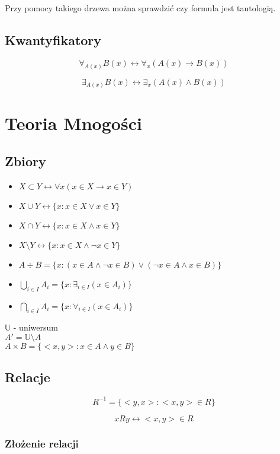 \documentclass{../notatki}
\begin{document}
Przy pomocy takiego drzewa można sprawdzić czy formula jest tautologią.

\subsection{Kwantyfikatory}

$$
\forall_{A(x)} B(x) \leftrightarrow \forall_{x} (A(x) \rightarrow B(x))
$$

$$
\exists_{A(x)} B(x) \leftrightarrow \exists_{x} (A(x) \land B(x))
$$

\section{Teoria Mnogości}

\subsection{Zbiory}

\begin{itemize}
  \item $X \subset Y \leftrightarrow \forall x (x \in X \rightarrow x \in Y)$
  \item $X \cup Y \leftrightarrow \{x : x \in X \lor x \in Y\}$
  \item $X \cap Y \leftrightarrow \{x : x \in X \land x \in Y\}$
  \item $X \setminus Y \leftrightarrow \{x : x \in X \land \neg x \in Y\}$
  \item $A \div B = \{x : (x \in A \land \neg x \in B) \lor (\neg x
    \in A \land x \in B)\}$
  \item $\bigcup_{i \in I} A_i = \{x: \exists_{i \in I}(x \in A_i)\}$
  \item $\bigcap_{i \in I} A_i = \{x: \forall_{i \in I}(x \in A_i)\}$
\end{itemize}
$\mathbb{U}$ - uniwersum \\
$A' = \mathbb{U} \setminus A$ \\
$A \times B = \{<x, y>: x \in A \land y \in B\}$

\subsection{Relacje}

$$
R^{-1} = \{<y, x>: <x, y> \in R\}
$$

$$
xRy \leftrightarrow <x, y> \in R
$$

\subsubsection{Złożenie relacji}
\end{document}
